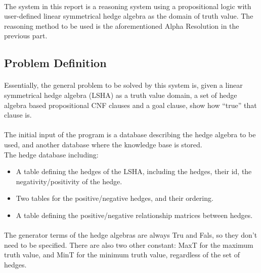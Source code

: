 \documentclass[26pt,fleqn,]{article}
\begin{document}
\paragraph{} The system in this report is a reasoning system using a propositional logic with user-defined linear symmetrical hedge algebra as the domain of truth value. The reasoning method to be used is the aforementioned Alpha Resolution in the previous part.

\subsection{Problem Definition}

\paragraph{}Essentially, the general problem to be solved by this system is, given a linear symmetrical hedge algebra (LSHA) as a truth value domain, a set of hedge algebra based propositional CNF clauses and a goal clause, show how “true” that clause is.\\

\paragraph{}The initial input of the program is a database describing the hedge algebra to be used, and another database where the knowledge base is stored.\\
The hedge database including:

\begin{itemize}
\item A table defining the hedges of the LSHA, including the hedges, their id, the negativity/positivity of the hedge.
\item Two tables for the positive/negative hedges, and their ordering.
\item A table defining the positive/negative relationship matrices between hedges.
\end{itemize}

\paragraph{}The generator terms of the hedge algebras are always Tru and Fals, so they don't need to be specified. There are also two other constant: MaxT for the maximum truth value, and MinT for the minimum truth value, regardless of the set of hedges.\\
\end{document}
